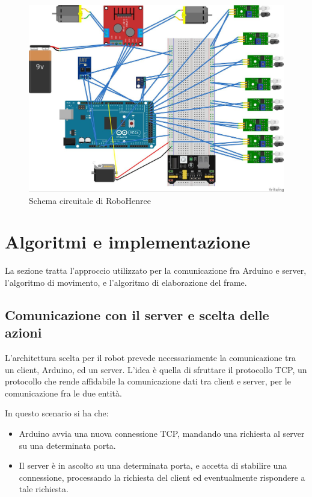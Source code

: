 \documentclass[a4paper,12pt,italian]{article}
\begin{document}
\begin{figure}[H]
	\begin{center}
	\includegraphics[scale=0.15]{circuito}
	\caption{Schema circuitale di RoboHenree}
	\label{Fig: circuito}
	\end{center}
\end{figure}

\section{Algoritmi e implementazione}
La sezione tratta l'approccio utilizzato per la comunicazione fra Arduino e server, l'algoritmo di movimento, e l'algoritmo di elaborazione del frame.

\subsection{Comunicazione con il server e scelta delle azioni}
L'architettura scelta per il robot prevede necessariamente la comunicazione tra un client, Arduino, ed un server. L'idea è quella di sfruttare il protocollo TCP, un protocollo che rende affidabile la comunicazione dati tra client e server, per le comunicazione fra le due entità.

In questo scenario si ha che:
\begin{itemize}
	\item Arduino avvia una nuova connessione TCP, mandando una richiesta al server su una determinata porta.
	\item Il server è in ascolto su una determinata porta, e accetta di stabilire una connessione, processando la richiesta del client ed eventualmente rispondere a tale richiesta.
\end{itemize}
\end{document}
